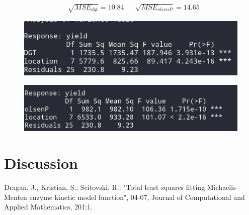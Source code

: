 \documentclass[12pt,fleqn]{article}
\begin{document}
\begin{align*}
	& \sqrt{MSE_{dgt}}	 = 10.84
	&& \sqrt{MSE_{olsenP}} = 14.65
\end{align*}



\begin{figure}[H]
	\centering
	\includegraphics[width=.7\linewidth]{anovaDGT}
\end{figure}
\begin{figure}[H]
	\centering
	\includegraphics[width=.7\linewidth]{anovaOP}
\end{figure}

\section{Discussion}
\begin{thebibliography}{9}
	Dragan, J., Kristian, S., Scitovski, R.: "Total least squares fitting Michaelis–Menten enzyme kinetic model function", 04-07, Journal of Computational and Applied Mathematics, 201:1. 

\end{thebibliography}
\end{document}
